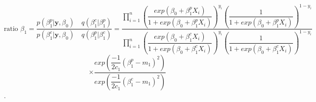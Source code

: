 \documentclass[10pt,a4paper]{article}
\begin{document}
\[ \text{ratio } \beta_1=\dfrac{p(\beta_1^p|\textbf{y}, \beta_0)\quad q(\beta_1^c|\beta_1^p)}{p(\beta_1^c|\textbf{y},\beta_0) \quad q(\beta_1^p|\beta_1^c)}=\dfrac{\prod_{i=1}^n\left(\dfrac{exp(\beta_0 + \beta_1^p X_i)}{1+exp(\beta_0 + \beta_1^p X_i)}\right)^{y_i}\left( \dfrac{1}{1+exp(\beta_0 + \beta_1^p X_i)}\right)^{1-y_i}}{\prod_{i=1}^n\left(\dfrac{exp(\beta_0+ \beta_1^c X_i)}{1+exp(\beta_0+ \beta^c_1 X_i)}\right)^{y_i}\left( \dfrac{1}{1+exp(\beta_0+ \beta_1^c X_i)}\right)^{1-y_i}}\]
\[\times \dfrac{exp\left(\dfrac{-1}{2c_1}(\beta_1^p-m_1)^2\right)}{exp\left(\dfrac{-1}{2c_1}(\beta_1^c-m_1)^2\right)}\].

%
\end{document}
